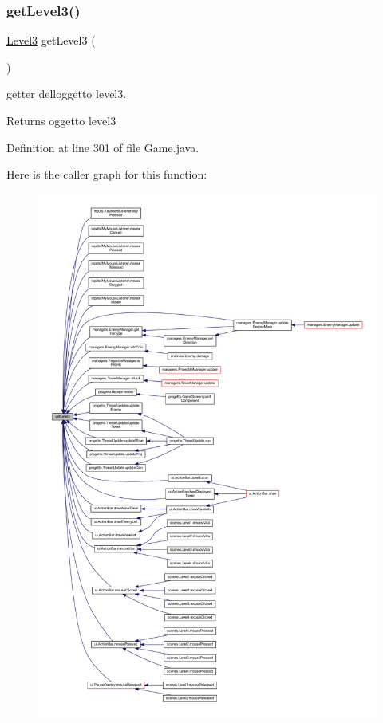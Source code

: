 \subsubsection{\texorpdfstring{get\+Level3()}{getLevel3()}}
{\footnotesize\ttfamily \hyperlink{classscenes_1_1_level3}{Level3} get\+Level3 (\begin{DoxyParamCaption}{ }\end{DoxyParamCaption})}



getter dell\textquotesingle{}oggetto level3. 

\begin{DoxyReturn}{Returns}
oggetto level3 
\end{DoxyReturn}


Definition at line 301 of file Game.\+java.

Here is the caller graph for this function\+:
\nopagebreak
\begin{figure}[H]
\begin{center}
\leavevmode
\includegraphics[width=350pt]{classprogetto_1_1_game_a0869f04fd1631b5ad909e51c85e9e57b_icgraph}
\end{center}
\end{figure}
\mbox{\label{classprogetto_1_1_game_a09e02ae6992f3328be34c9062ef142f8}} 
